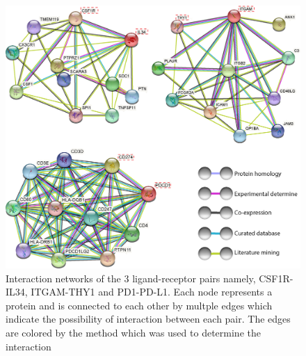 \begin{figure}[htp]
    \centering
    \includegraphics[width=0.66\columnwidth]{Chapter2/Figures/Supplemental_Fig_S1.png}
    \caption{Interaction networks of the 3 ligand-receptor pairs namely, CSF1R-IL34, ITGAM-THY1 and PD1-PD-L1. Each node represents a protein and is connected to each other by multple edges which indicate the possibility of interaction between each pair. The edges are colored by the method which was used to determine the interaction}
    \label{fig:Chap2_Supfigure1}
\end{figure}
